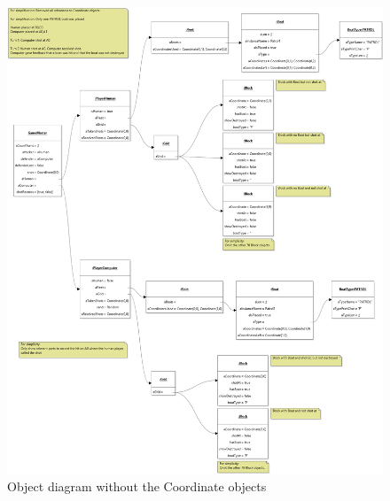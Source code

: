 \documentclass{article}
\begin{document}
\begin{figure}[h]
\centering
\includegraphics[width = \linewidth]{images/object_diagram_simplified.png}
\caption{Object diagram without the Coordinate objects}
\end{figure}
\end{document}
